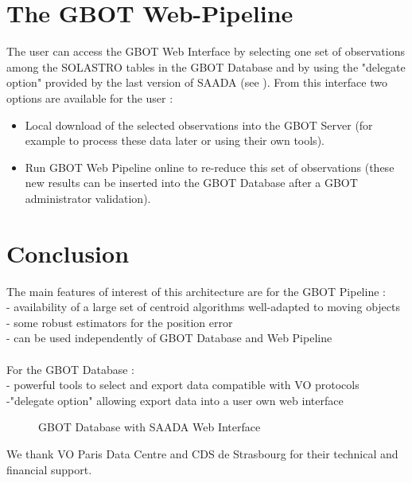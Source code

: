\section{The GBOT Web-Pipeline}
The user can access the GBOT Web Interface by selecting one set of observations among the SOLASTRO tables in the GBOT Database and by using the "delegate option" provided by the last version of SAADA (see \citet{michel12}). From this interface two options are available for the user :
\begin{itemize}
\item Local download of the selected observations into the GBOT Server
(for example to process these data later or using their own tools).
\item Run GBOT Web Pipeline online to re-reduce this set of observations
(these new results can be inserted into the GBOT Database after a GBOT administrator validation).
\end{itemize}

\section{Conclusion}
The main features of interest of this architecture  are for the GBOT Pipeline :\\
\hspace*{0.25cm}- availability of a large set of centroid algorithms well-adapted to moving objects\\
\hspace*{0.25cm}- some robust estimators for the position error \\
\hspace*{0.25cm}- can be used independently of GBOT Database and Web Pipeline\\\\
For the GBOT Database : \\
\hspace*{0.25cm}- powerful tools to select and export data compatible with VO protocols \\
\hspace*{0.25cm}-"delegate option" allowing export data into a user own web interface

\begin{figure}[ht]
\caption{GBOT Database with SAADA Web Interface} \label{P03-fig-1}
\end{figure}



\acknowledgements 
We thank VO Paris Data Centre and CDS de Strasbourg for their technical and financial support.



